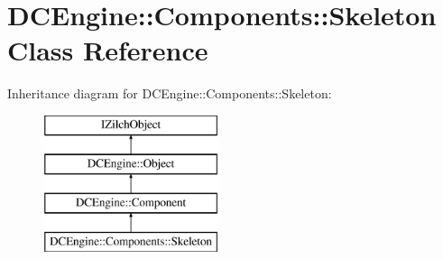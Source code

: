 \hypertarget{classDCEngine_1_1Components_1_1Skeleton}{\section{D\-C\-Engine\-:\-:Components\-:\-:Skeleton Class Reference}
\label{classDCEngine_1_1Components_1_1Skeleton}
}
Inheritance diagram for D\-C\-Engine\-:\-:Components\-:\-:Skeleton\-:\begin{figure}[H]
\begin{center}
\leavevmode
\includegraphics[height=4.000000cm]{classDCEngine_1_1Components_1_1Skeleton}
\end{center}
\end{figure}
